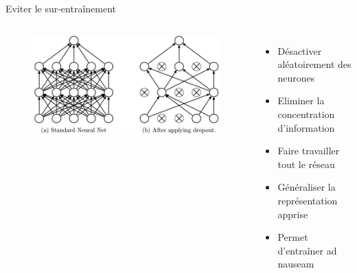 \documentclass{beamer}
\begin{document}
\begin{frame}{Eviter le sur-entraînement}

  \begin{columns}
    \begin{figure}
      \centering
      \includegraphics[scale=0.3]{../Figures/dropout}
    \end{figure}

    \begin{itemize}
    \item Désactiver aléatoirement des neurones\pause
    \item Eliminer la concentration d'information\pause
    \item Faire travailler tout le réseau\pause
    \item Généraliser la représentation apprise\pause
    \item Permet d'entraîner ad nauseam
    \end{itemize}
  \end{columns}
\end{frame}
\end{document}
